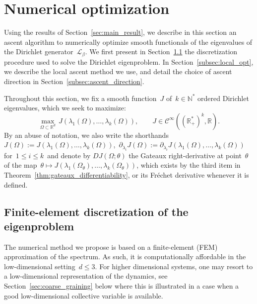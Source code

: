 \documentclass[a4]{article}
\newcommand{\cL}{\mathcal{L}}
\newcommand{\R}{\mathbb{R}}
\newcommand{\N}{\mathbb N}
\newcommand{\1}{\mathbbm 1}
\begin{document}
\section{Numerical optimization}
\label{sec:ascent}
Using the results of Section~\ref{sec:main_result}, we describe in this section an ascent algorithm to numerically optimize smooth functionals of the eigenvalues of the Dirichlet generator~$\cL_\beta$.
We first present in Section~\ref{subsec:fem} the discretization procedure used to solve the Dirichlet eigenproblem. In Section~\ref{subsec:local_opt}, we describe the local ascent method we use, and detail the choice of ascent direction in Section~\ref{subsec:ascent_direction}. 

Throughout this section, we fix a smooth function~$J$ of~$k\in \N^*$ ordered Dirichlet eigenvalues, which we seek to maximize:
\begin{equation}
    \label{eq:functional}
        \underset{\Omega\subset\R^d}{\max}\, J\left(\lambda_1(\Omega),\dots,\lambda_{k}(\Omega)\right),\qquad J \in \mathcal C^{\infty}\left(\left(\R_+^*\right)^k,\R\right).
\end{equation}
By an abuse of notation, we also write the shorthands $J(\Omega):=J\left(\lambda_1(\Omega),\dots,\lambda_{k}(\Omega)\right)$,~$\partial_{\lambda_i} J(\Omega):= \partial_{\lambda_i} J(\lambda_1(\Omega),\dots,\lambda_k(\Omega))$ for~$1\leq i\leq k$~and denote by $DJ(\Omega;\theta)$ the Gateaux right-derivative at point~$\theta$ of the map~$\theta\mapsto J\left(\lambda_1(\Omega_\theta),\dots,\lambda_k(\Omega_\theta)\right)$, which exists by the third item in Theorem~\ref{thm:gateaux_differentiability}, or its Fr\'echet derivative whenever it is defined.

\subsection{Finite-element discretization of the eigenproblem}
\label{subsec:fem}
The numerical method we propose is based on a finite-element (FEM) approximation of the spectrum. As such, it is computationally affordable in the low-dimensional setting~$d\leq 3$.
For higher dimensional systems, one may resort to a low-dimensional representation of the dynamics, see Section~\ref{sec:coarse_graining} below where this is illustrated in a case when a good low-dimensional collective variable is available.
\end{document}
